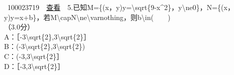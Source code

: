 \documentclass[]{article}
\begin{document}
~100023719~~\href{../question/viewQuestionDetail.jsp?questionID=100023719\&testPaperId=100229072}{查看}~~5.已知M=\{(x，y)\textbar{}y=\textbackslash{}sqrt\{9-x\^{}2\}，y\textbackslash{}ne0\}，N=\{(x，y)\textbar{}y=x+b\}，若M\textbackslash{}capN\textbackslash{}ne\textbackslash{}varnothing，则b\textbackslash{}in(　　)\\
\hspace*{0.333em}\hspace*{0.333em}（3.0分）\\
\hspace*{0.333em}\hspace*{0.333em}\hspace*{0.333em}\hspace*{0.333em}\hspace*{0.333em}\hspace*{0.333em}\hspace*{0.333em}\hspace*{0.333em}A：［-3\textbackslash{}sqrt\{2\},3\textbackslash{}sqrt\{2\}］\\
\hspace*{0.333em}\hspace*{0.333em}\hspace*{0.333em}\hspace*{0.333em}\hspace*{0.333em}\hspace*{0.333em}\hspace*{0.333em}\hspace*{0.333em}B：(-3\textbackslash{}sqrt\{2\},3\textbackslash{}sqrt\{2\})\\[2\baselineskip]\hspace*{0.333em}\hspace*{0.333em}\hspace*{0.333em}\hspace*{0.333em}\hspace*{0.333em}\hspace*{0.333em}\hspace*{0.333em}\hspace*{0.333em}C：(-3,3\textbackslash{}sqrt\{2\}］\\
\hspace*{0.333em}\hspace*{0.333em}\hspace*{0.333em}\hspace*{0.333em}\hspace*{0.333em}\hspace*{0.333em}\hspace*{0.333em}\hspace*{0.333em}D：［-3,3\textbackslash{}sqrt\{2\}］
\end{document}
